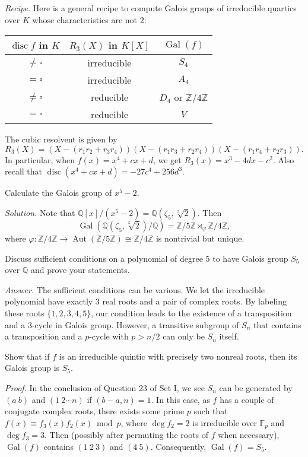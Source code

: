 \documentclass{mathproblems}
\newcommand\Q{\mathbb{Q}}
\newcommand\Z{\mathbb{Z}}
\newcommand\F{\mathbb{F}}
\DeclareMathOperator{\Gal}{Gal}
\begin{document}
\begin{questions}
{\color{violet}
\textit{Recipe.} Here is a general recipe to compute Galois groups of irreducible quartics over $K$ whose characteristics are not 2:
\begin{center}
\begin{tabular}{c|c|c}
$\operatorname{disc} f$ in $K$ & $R_{3}(X)$ in $K[X]$ & $\Gal(f)$ \\
\hline$\neq \square$ & irreducible & $S_{4}$ \\
$=\square$ & irreducible & $A_{4}$ \\
$\neq \square$ & reducible & $D_{4}$ or $\Z / 4 \Z$ \\
$=\square$ & reducible & $V$
\end{tabular}
\end{center}
The cubic resolvent is given by
$$
R_{3}(X)=(X-(r_{1} r_{2}+r_{3} r_{4}))(X-(r_{1} r_{3}+r_{2} r_{4}))(X-(r_{1} r_{4}+r_{2} r_{3})).
$$
In particular, when $f(x)=x^{4}+c x+d$, we get $R_{3}(x)=x^{3}-4 d x-c^{2}$. Also recall that $\operatorname{disc}(x^{4}+c x+d)=-27c^4+256d^3$.
}

\miquestion
{\color{blue} Calculate the Galois group of $x^{5}-2$.}

\textit{Solution.}
Note that $\Q[x]/(x^5-2)=\Q(\zeta_5, \sqrt[5]{2})$. Then
$$
\Gal(\Q(\zeta_5, \sqrt[5]{2})/\Q)=\Z/5\Z \rtimes_{\varphi} \Z/4\Z,
$$
where $\varphi:\Z/4\Z \to \operatorname{Aut}(\Z/5\Z)\cong \Z/4\Z$ is nontrivial but unique.


\miquestion
{\color{blue} Discuss sufficient conditions on a polynomial of degree 5 to have Galois group $S_{5}$ over $\Q$ and prove your statements.}

\textit{Answer.} The sufficient conditions can be various. We let the irreducible polynomial have exactly 3 real roots and a pair of complex roots. By labeling these roots $\{1,2,3,4,5\}$, our condition leads to the existence of a transposition and a 3-cycle in Galois group. However, a transitive subgroup of $S_n$ that contains a transposition and a $p$-cycle with $p>n/2$ can only be $S_n$ itself. 


\miquestion
{\color{blue} Show that if $f$ is an irreducible quintic with precisely two nonreal roots, then its Galois group is $S_{5}$.}

\textit{Proof.} In the conclusion of Question 23 of Set I, we see $S_n$ can be generated by $(a\ b)$ and $(1\ 2 \cdots n)$ if $(b-a,n)=1$. In this case, as $f$ has a couple of conjugate complex roots, there exists some prime $p$ such that $f(x)\equiv f_3(x)f_2(x)\bmod p$, where $\deg f_2=2$ is irreducible over $\F_p$ and $\deg f_3=3$. Then (possibly after permuting the roots of $f$ when necessary), $\Gal(f)$ contains $(1\ 2\ 3)$ and $(4\ 5)$. Consequently, $\Gal(f)=S_5$.


\end{questions}
\end{document}
